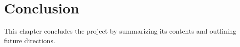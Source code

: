 \documentclass [11pt, proquest] {uwthesis}[2020/02/24]
\begin{document}


    

\chapter{Conclusion}
This chapter concludes the project by summarizing its contents and outlining future directions.
\end{document}
